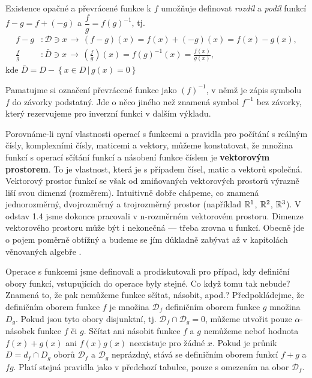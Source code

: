       Existence opačné a převrácené funkce k \(f\) umožňuje definovat \emph{rozdíl} a \emph{podíl} 
      funkcí \(f-g=f+(-g)\) a \(\dfrac{f}{g}=f(g)^{-1}\), tj.
      \begin{align*}
        f-g         &: \mathcal{D}\ni x\,\rightarrow\, (f-g)(x)=f(x)+(-g)(x)= f(x)-g(x), \\
        \frac{f}{g} &: \bar{D}\ni x\,\rightarrow\, 
                       \left(\frac{f}{g}\right)(x) = f(g)^{-1}(x) = \frac{f(x)}{g(x)}, 
      \end{align*}
      kde \(\bar{D}=D-\left\{x\in D\,|\,g(x)=0 \right\}\) 
      
      \begin{note}
        Pamatujme si označení převrácené funkce jako \((f)^{-1}\), v němž je zápis symbolu \(f\) do 
        závorky podstatný. Jde o něco jiného než znamená symbol \(f^{-1}\) bez závorky, který 
        rezervujeme pro inverzní funkci v dalším výkladu.
      \end{note}
      \begin{note}
        Porovnáme-li nyní vlastnosti operací s funkcemi a pravidla pro počítání s reálným čísly, 
        komplexními čísly, maticemi a vektory, můžeme konstatovat, že množina funkcí s operací 
        sčítání funkcí a násobení funkce číslem je \textbf{vektorovým prostorem}. To je vlastnost, 
        která je s případem čísel, matic a vektorů společná. Vektorový prostor funkcí se však od 
        zmiňovaných vektorových prostorů výrazně liší svou dimenzí (rozměrem). Intuitivně dobře 
        chápeme, co znamená jednorozměrný, dvojrozměrný a trojrozměrný prostor (například 
        \(\mathbb{R}^1\), \(\mathbb{R}^2\), \(\mathbb{R}^3\)). V odstav 1.4 jsme dokonce pracovali v 
        n-rozměrném vektorovém prostoru. Dimenze vektorového prostoru může být i nekonečná — třeba 
        zrovna u funkcí. Obecně jde o pojem poměrně obtížný a budeme se jím důkladně zabývat až v 
        kapitolách věnovaných algebře \cite[s.~58]{Musilova2009MA1}.
      \end{note}
      
      Operace s funkcemi jsme definovali a prodiskutovali pro případ, kdy definiční obory funkcí, 
      vstupujících do operace byly stejné. Co když tomu tak nebude? Znamená to, že pak nemůžeme 
      funkce sčítat, násobit, apod.? Předpokládejme, že definičním oborem funkce \(f\) je množina 
      \(\mathcal{D}_f\) definičním oborem funkce \(g\) množina \(D_g\). Pokud jsou tyto obory 
      disjunktní, tj. \(\mathcal{D}_f \cap \mathcal{D}_g = 0\), můžeme utvořit pouze 
      \(\alpha\)-násobek funkce \(f\) či \(g\). Sčítat ani násobit funkce \(f\) a \(g\) nemůžeme 
      neboť hodnota \(f(x) + g(x)\) ani \(f(x)g(x)\) neexistuje pro žádné \(x\). Pokud je průnik 
      \(D=d_f\cap D_g\) oborů \(\mathcal{D}_f\) a \(\mathcal{D}_g\) neprázdný, stává se definičním 
      oborem funkcí \(f+g\) a \(fg\). Platí stejná pravidla jako v předchozí tabulce, pouze s 
      omezením na obor \(\mathcal{D}_f\).
    
